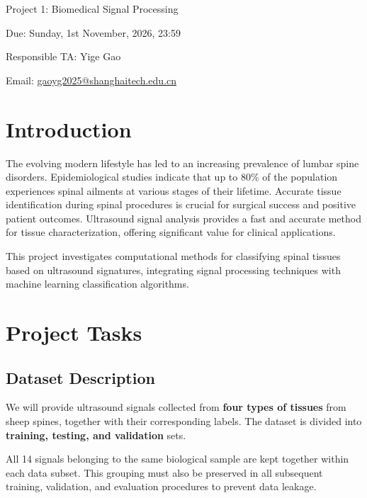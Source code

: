 \documentclass[11pt]{article}
\begin{document}
\begin{center}
    {\LARGE Project 1: Biomedical Signal Processing}\par
    \vspace{1.5em}
    {\large Due: Sunday, 1st November, 2026, 23:59}\par
    {\large Responsible TA: Yige Gao}\par
    {\large Email: \href{mailto:gaoyg2025@shanghaitech.edu.cn}{gaoyg2025@shanghaitech.edu.cn}}
\end{center}

\vspace{1.5em}

\section{Introduction}

The evolving modern lifestyle has led to an increasing prevalence of lumbar spine disorders. Epidemiological studies indicate that up to 80\% of the population experiences spinal ailments at various stages of their lifetime. Accurate tissue identification during spinal procedures is crucial for surgical success and positive patient outcomes. Ultrasound signal analysis provides a fast and accurate method for tissue characterization, offering significant value for clinical applications.

This project investigates computational methods for classifying spinal tissues based on ultrasound signatures, integrating signal processing techniques with machine learning classification algorithms.

\section{Project Tasks}

\subsection{Dataset Description}

We will provide ultrasound signals collected from \textbf{four types of tissues} from sheep spines, together with their corresponding labels. The dataset is divided into \textbf{training, testing, and validation} sets.

All 14 signals belonging to the same biological sample are kept together within each data subset. This grouping must also be preserved in all subsequent training, validation, and evaluation procedures to prevent data leakage.
\end{document}
